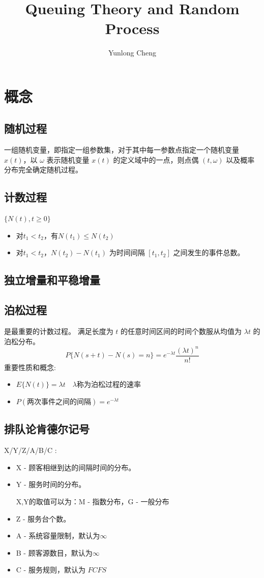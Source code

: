 \documentclass[12pt,a4paper]{article}
\title{Queuing Theory and Random Process}
\author{Yunlong Cheng}
\begin{document}
\maketitle
\section{概念}
\subsection{随机过程}
一组随机变量，即指定一组参数集，对于其中每一参数点指定一个随机变量 $x(t)$，以 $\omega$ 表示随机变量 $x(t)$ 的定义域中的一点，则点偶 $(t,\omega)$ 以及概率分布完全确定随机过程。
\subsection{计数过程}
$\{N(t),t\ge 0\}$
\begin{itemize}
  \item 对$t_1<t_2$，有$N(t_1)\le N(t_2)$
  \item 对$t_1<t_2$，$N(t_2) - N(t_1)$ 为时间间隔 $[t_1,t_2]$ 之间发生的事件总数。
\end{itemize}

\subsection{独立增量和平稳增量}
\subsection{泊松过程}
是最重要的计数过程。
满足长度为 $t$ 的任意时间区间的时间个数服从均值为 $\lambda t$ 的泊松分布。
$$P\{N(s+t) - N(s) = n\} = e^{-\lambda t}\frac{{(\lambda t)}^n}{n!}$$
{\color{red} 重要性质和概念:}
\begin{itemize}
  \item $E\{N(t)\} = \lambda t\quad\lambda $称为泊松过程的速率
  \item $P(\text{两次事件之间的间隔}) = e^{-\lambda t}$
\end{itemize}
\subsection{排队论肯德尔记号}
X/Y/Z/A/B/C :
\begin{itemize}
  \item X - 顾客相继到达的间隔时间的分布。
  \item Y - 服务时间的分布。

  X,Y的取值可以为：M - 指数分布，G - 一般分布
  \item Z - 服务台个数。
  \item A - 系统容量限制，默认为$\infty$
  \item B - 顾客源数目，默认为$\infty$
  \item C - 服务规则，默认为 $FCFS$
\end{itemize}
\end{document}
